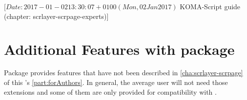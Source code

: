 %
%
%
%
%
%
%
%
% 
%
%
%
%

%
                 [$Date: 2017-01-02 13:30:07 +0100 (Mon, 02 Jan 2017) $
                  KOMA-Script guide (chapter: scrlayer-scrpage-experts)]


\chapter[{Additional Features of \Package{scrlayer-scrpage}}]
  {Additional Features with
    package }
%
\BeginIndexGroup
{}%
Package  provides features that have not been
described in \autoref{cha:scrlayer-scrpage} of this 's \autoref{part:forAuthors}. In general, the average user will
not need those extensions and some of them are only provided for
compatibility with .

